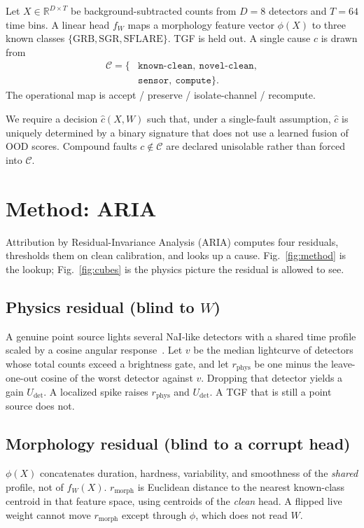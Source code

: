 \documentclass[journal]{IEEEtran}
\begin{document}
Let $X\in\mathbb{R}^{D\times T}$ be background-subtracted counts from $D=8$ detectors and $T=64$ time bins. A linear head $f_W$ maps a morphology feature vector $\phi(X)$ to three known classes $\{\mathrm{GRB},\mathrm{SGR},\mathrm{SFLARE}\}$. TGF is held out. A single cause $c$ is drawn from
\begin{align*}
\mathcal{C}=\{&\texttt{known-clean},\ \texttt{novel-clean},\\
&\texttt{sensor},\ \texttt{compute}\}.
\end{align*}
The operational map is accept / preserve / isolate-channel / recompute.

We require a decision $\hat{c}(X,W)$ such that, under a single-fault assumption, $\hat{c}$ is uniquely determined by a binary signature that does not use a learned fusion of OOD scores. Compound faults $c\notin\mathcal{C}$ are declared unisolable rather than forced into $\mathcal{C}$.

\section{Method: ARIA}

Attribution by Residual-Invariance Analysis (ARIA) computes four residuals, thresholds them on clean calibration, and looks up a cause. Fig.~\ref{fig:method} is the lookup; Fig.~\ref{fig:cubes} is the physics picture the residual is allowed to see.

\subsection{Physics residual (blind to $W$)}
A genuine point source lights several NaI-like detectors with a shared time profile scaled by a cosine angular response~\cite{meegan2009,connaughton2015}. Let $v$ be the median lightcurve of detectors whose total counts exceed a brightness gate, and let $r_{\mathrm{phys}}$ be one minus the leave-one-out cosine of the worst detector against $v$. Dropping that detector yields a gain $U_{\mathrm{det}}$. A localized spike raises $r_{\mathrm{phys}}$ and $U_{\mathrm{det}}$. A TGF that is still a point source does not.

\subsection{Morphology residual (blind to a corrupt head)}
$\phi(X)$ concatenates duration, hardness, variability, and smoothness of the \emph{shared} profile, not of $f_W(X)$. $r_{\mathrm{morph}}$ is Euclidean distance to the nearest known-class centroid in that feature space, using centroids of the \emph{clean} head. A flipped live weight cannot move $r_{\mathrm{morph}}$ except through $\phi$, which does not read $W$.
\end{document}
